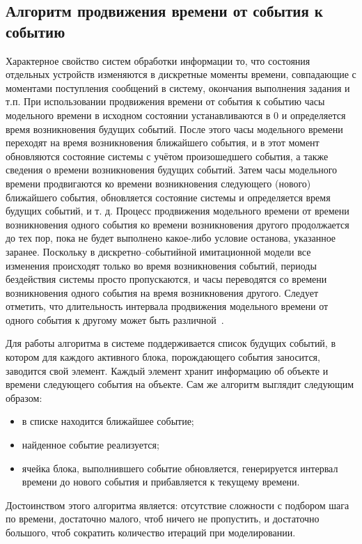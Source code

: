 \subsection{Алгоритм продвижения времени от события к событию}

Характерное свойство систем обработки информации то, что состояния отдельных устройств изменяются в дискретные моменты времени, совпадающие с моментами поступления сообщений в систему, окончания
выполнения задания и т.п. При использовании продвижения времени от события к событию часы модельного времени в исходном состоянии устанавливаются в 0 и определяется время возникновения будущих событий. После этого часы модельного времени переходят на время возникновения ближайшего события, и в этот момент обновляются состояние системы с учётом произошедшего события, а также сведения о времени возникновения будущих событий. Затем часы модельного времени продвигаются ко времени возникновения следующего (нового) ближайшего события, обновляется состояние системы и определяется время будущих событий, и т. д. Процесс продвижения модельного времени от времени возникновения одного события ко времени возникновения другого продолжается до тех пор, пока не будет выполнено какое-либо условие останова, указанное заранее. Поскольку в дискретно--событийной имитационной модели все изменения происходят только во время возникновения событий, периоды бездействия системы просто пропускаются, и часы переводятся со времени возникновения одного события на время возникновения другого. Следует отметить, что длительность интервала продвижения модельного времени от одного события к другому может быть различной~\cite{time_alg}.

Для работы алгоритма в системе поддерживается список будущих событий, в котором для каждого активного блока, порождающего события заносится, заводится свой элемент. Каждый элемент хранит информацию об объекте и времени следующего события на объекте. Сам же алгоритм выглядит следующим образом:
\begin{itemize}[label=---]
	\item в списке находится ближайшее событие; 
	\item найденное событие реализуется;
	\item ячейка блока, выполнившего событие обновляется, генерируется интервал времени до нового события и прибавляется к текущему времени.
\end{itemize}

Достоинством этого алгоритма является: отсутствие сложности с подбором шага по времени, достаточно малого, чтоб ничего не пропустить, и достаточно большого, чтоб сократить количество итераций при моделировании.

